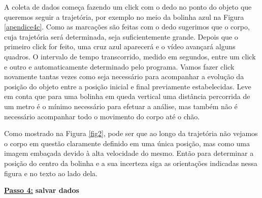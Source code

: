 \documentclass[12pt]{article}
\begin{document}
A coleta de dados começa fazendo um click com o dedo no ponto do objeto que queremos seguir a trajetória, por exemplo no meio da bolinha azul na Figura \ref{apendice4c}. Como as marcações são feitas com o dedo sugerimos que o corpo, cuja trajetória será determinada, seja suficientemente grande.
Depois que o primeiro click for feito, uma cruz azul aparecerá e o vídeo avançará alguns quadros. O intervalo de tempo transcorrido, medido em segundos, entre um click e outro e automaticamente determinado pelo programa. Vamos fazer click novamente tantas vezes como seja necessário para acompanhar a evolução da posição do objeto entre a posição inicial e final previamente estabelecidas. Leve em conta que para uma bolinha em queda vertical uma distância percorrida de um metro é o mínimo necessário para efetuar a análise, mas também não é necessário acompanhar 
todo o movimento do corpo até o chão.
\par 
Como mostrado na Figura \ref{fig2},  pode ser que ao longo da trajetória não vejamos o corpo em questão claramente definido em uma única posição, mas como uma imagem embaçada devido à alta velocidade do mesmo. Então para determinar a posição do centro da bolinha e a sua incerteza siga as orientações indicadas nessa figura e no texto ao lado dela. 
\par
\vskip 0.5cm
\underline{\bf Passo 4:} {\bf salvar dados}\\
\indent
\end{document}
